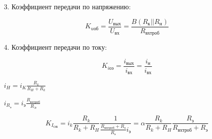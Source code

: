 3. Коэффициент передачи по напряжению:

$$
K_\textit{uоб}=\frac{U_\textit{вых}}{U_\textit{вх}}=\frac{B(R_\textit{к}||R_\textit{н})}{R_\textit{вхтроб}}
$$

4. Коэффициент передачи по току:

$$K_\textit{iоэ}=\frac{i_\textit{вых}}{i_\textit{вх}}=\frac{i_\textit{н}}{i_\textit{вх}}$$

$i_H=i_K\frac{R_k}{R_H+R_k}$

$i_{R_\textit{э}}=i_\textit{э}\frac{R_\textit{вхтроб}}{R_\textit{Э}}$

$$
K_{I_\textit{ОБ}}=i_k\frac{R_k}{R_k+R_H}\frac{1}{\frac{R_\textit{вхтроб}+R_\textit{э}}{R_\textit{э}}i_\textit{э}}=\alpha \frac{R_k}{R_k+R_H} \frac{R_\textit{э}}{R_\textit{вхтроб}+R_\textit{э}}
$$

\pagebreak
